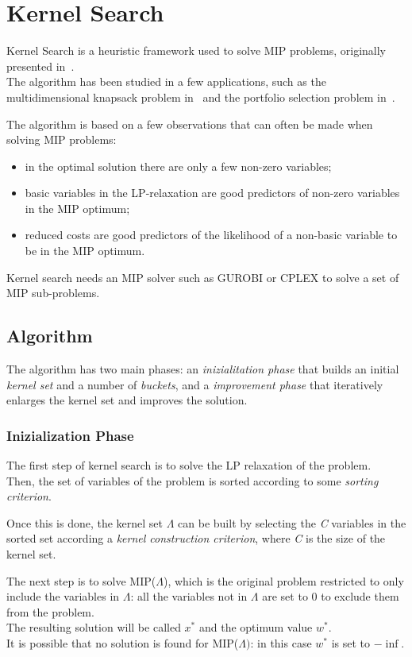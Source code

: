 \chapter{Kernel Search}\label{ch:kernel-search}
Kernel Search is a heuristic framework used to solve MIP problems, originally presented in~\cite{kernel:2007}.\\
The algorithm has been studied in a few applications, such as the multidimensional knapsack problem
in~\cite{kernel:2010} and the portfolio selection problem in~\cite{kernel:2012}.

The algorithm is based on a few observations that can often be made when solving MIP problems:
\begin{itemize}
    \item in the optimal solution there are only a few non-zero variables;
    \item basic variables in the LP-relaxation are good predictors of non-zero variables in the MIP optimum;
    \item reduced costs are good predictors of the likelihood of a non-basic variable to be in the MIP optimum.
\end{itemize}

Kernel search needs an MIP solver such as GUROBI or CPLEX to solve a set of MIP sub-problems.


\section{Algorithm}
The algorithm has two main phases: an \textit{inizialitation phase}
that builds an initial \textit{kernel set} and a number of \textit{buckets},
and a \textit{improvement phase} that iteratively enlarges the kernel set and improves the solution.

\subsection{Inizialization Phase}
The first step of kernel search is to solve the LP relaxation of the problem.\\
Then, the set of variables of the problem is sorted according to some \textit{sorting criterion}.

Once this is done, the kernel set \(\Lambda\) can be built by selecting the \textit{C}
variables in the sorted set according a \textit{kernel construction criterion},
where \textit{C} is the size of the kernel set.

The next step is to solve MIP(\(\Lambda\)),
which is the original problem restricted to only include the variables in \(\Lambda\):
all the variables not in \(\Lambda\) are set to 0 to exclude them from the problem.\\
The resulting solution will be called \(x^{*}\) and the optimum value \(w^{*}\).\\
It is possible that no solution is found for MIP(\(\Lambda)\): in this case \(w^{*}\) is set to \(-\inf\).


